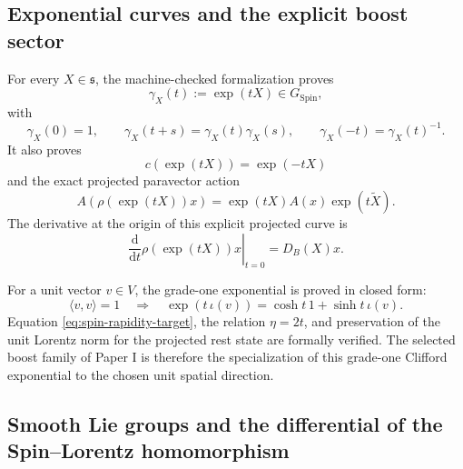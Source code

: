 \documentclass[11pt,a4paper]{article}
\theoremstyle{remark}
\newcommand{\SpinG}{G_{\mathrm{Spin}}}
\newcommand{\dd}{\mathrm d}
\begin{document}
\subsection{Exponential curves and the explicit boost sector}

For every \(X\in\mathfrak s\), the machine-checked formalization proves
\begin{equation}
  \gamma_X(t):=\exp(tX)\in\SpinG,
\tag{4.5}
\end{equation}
with
\begin{equation}
  \gamma_X(0)=1,
  \qquad
  \gamma_X(t+s)=\gamma_X(t)\gamma_X(s),
  \qquad
  \gamma_X(-t)=\gamma_X(t)^{-1}.
\tag{4.6}
\end{equation}
It also proves
\begin{equation}
  c(\exp(tX))=\exp(-tX)
\tag{4.7}
\end{equation}
and the exact projected paravector action
\begin{equation}
  A\!\left(\rho(\exp(tX))x\right)
  =\exp(tX)A(x)\exp(t\widetilde X).
\tag{4.8}
\end{equation}
The derivative at the origin of this explicit projected curve is
\begin{equation}
  \left.\frac{\dd}{\dd t}\rho(\exp(tX))x\right|_{t=0}
  =D_B(X)x.
\tag{4.9}\label{eq:projected-exp-derivative}
\end{equation}

For a unit vector \(v\in V\), the grade-one exponential is proved in closed form:
\begin{equation}
  \langle v,v\rangle=1
  \quad\Longrightarrow\quad
  \exp(t\,\iota(v))
  =\cosh t\,1+\sinh t\,\iota(v).
\tag{4.10}\label{eq:formal-grade-one-exp}
\end{equation}
Equation \eqref{eq:spin-rapidity-target}, the relation \(\eta=2t\), and preservation of the unit Lorentz norm for the projected rest state are formally verified.  The selected boost family of Paper I is therefore the specialization of this grade-one Clifford exponential to the chosen unit spatial direction.

\subsection{Smooth Lie groups and the differential of the Spin--Lorentz homomorphism}
\end{document}
